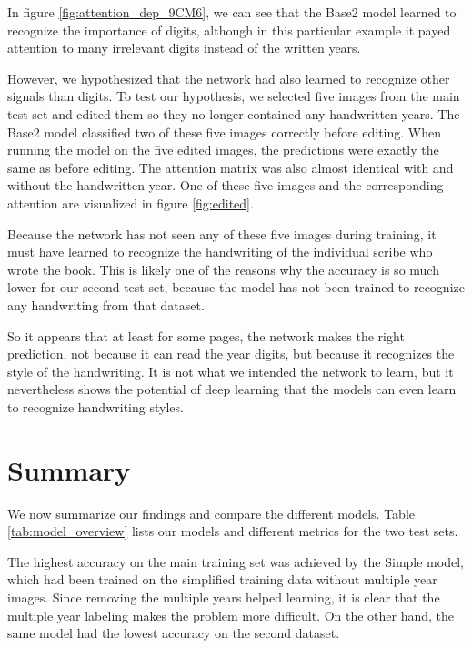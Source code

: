 

In figure \ref{fig:attention_dep_9CM6}, we can see that the  Base2 model learned to recognize the importance of digits, although in this particular example it payed attention to many irrelevant digits instead of the written years.



However, we hypothesized that the network had also learned to recognize other signals than digits. To test our hypothesis, we selected five images from the main test set and edited them so they no longer contained any handwritten years. The  Base2 model classified two of these five images correctly before editing. When running the model on the five edited images, the predictions were exactly the same as before editing. The attention matrix was also almost identical with and without the handwritten year. One of these five images and the corresponding attention are visualized in figure \ref{fig:edited}.

Because the network has not seen any of these five images during training, it must have learned to recognize the handwriting of the individual scribe who wrote the book. This is likely one of the reasons why the accuracy is so much lower for our second test set, because the model has not been trained to recognize any handwriting from that dataset.

So it appears that at least for some pages, the network makes the right prediction, not because it can read the year digits, but because it recognizes the style of the handwriting. It is not what we intended the network to learn, but it nevertheless shows the potential of deep learning that the models can even learn to recognize handwriting styles.


\section{Summary}

We now summarize our findings and compare the different models. Table \ref{tab:model_overview} lists our models and different metrics for the two test sets.



The highest accuracy on the main training set was achieved by the Simple model, which had been trained on the simplified training data without multiple year images.
Since removing the multiple years helped learning, it is clear that the multiple year labeling makes the problem more difficult.
On the other hand, the same model had the lowest accuracy on the second dataset.

